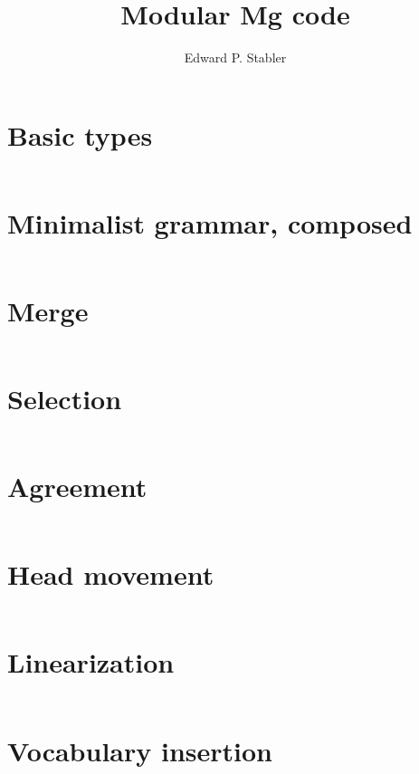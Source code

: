\documentclass{article}
\title{Modular Mg code}
\author{Edward P. Stabler}
\begin{document}
\thispagestyle{empty}

\setcounter{section}{-1}

\eject
\section{Basic types}
%
\inputminted[fontsize=\footnotesize]{haskell}{MgTypes.hs}

\section{Minimalist grammar, composed}
\inputminted[fontsize=\footnotesize]{haskell}{Mg.hs}

\section{Merge}
%
\inputminted[fontsize=\footnotesize]{haskell}{Mrg.hs}

\section{Selection}
%
\inputminted[fontsize=\footnotesize]{haskell}{Sel.hs}

\eject
\section{Agreement}
%
\inputminted[fontsize=\footnotesize]{haskell}{Agr.hs}

\section{Head movement}
%
\inputminted[fontsize=\footnotesize]{haskell}{Hm.hs}

\section{Linearization}
%
\inputminted[fontsize=\footnotesize]{haskell}{Lin.hs}

\eject
\section{Vocabulary insertion}
%
\inputminted[fontsize=\footnotesize]{haskell}{Vi.hs}
\end{document}
